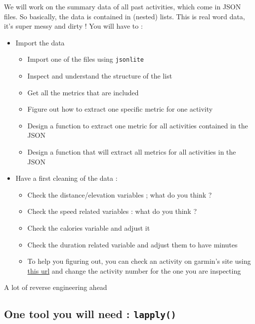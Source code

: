 \documentclass[
]{book}
\providecommand{\tightlist}{%
  \setlength{\itemsep}{0pt}\setlength{\parskip}{0pt}}
\begin{document}
We will work on the summary data of all past activities, which come in JSON files. So basically, the data is contained in (nested) lists. This is real word data, it's super messy and dirty !
You will have to :

\begin{itemize}
\tightlist
\item
  Import the data

  \begin{itemize}
  \tightlist
  \item
    Import one of the files using \texttt{jsonlite}
  \item
    Inspect and understand the structure of the list
  \item
    Get all the metrics that are included
  \item
    Figure out how to extract one specific metric for one activity
  \item
    Design a function to extract one metric for all activities contained in the JSON
  \item
    Design a function that will extract all metrics for all activities in the JSON
  \end{itemize}
\item
  Have a first cleaning of the data :

  \begin{itemize}
  \tightlist
  \item
    Check the distance/elevation variables ; what do you think ?
  \item
    Check the speed related variables : what do you think ?
  \item
    Check the calories variable and adjust it
  \item
    Check the duration related variable and adjust them to have minutes
  \item
    To help you figuring out, you can check an activity on garmin's site using \href{https://connect.garmin.com/modern/activity/5570974040}{this url} and change the activity number for the one you are inspecting
  \end{itemize}
\end{itemize}

A lot of reverse engineering ahead

\hypertarget{one-tool-you-will-need-lapply}{%
\subsection{\texorpdfstring{One tool you will need : \texttt{lapply()}}{One tool you will need : lapply()}}\label{one-tool-you-will-need-lapply}}
\end{document}
